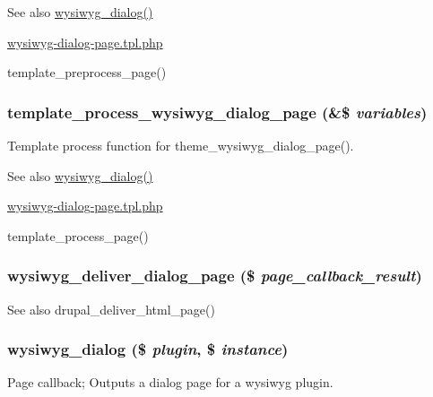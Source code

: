 \begin{DoxySeeAlso}{See also}
\hyperlink{wysiwyg_8dialog_8inc_a57c7ce003075f4a07b9a555a822755b8}{wysiwyg\_\-dialog()} 

\hyperlink{wysiwyg-dialog-page_8tpl_8php}{wysiwyg-\/dialog-\/page.tpl.php} 

template\_\-preprocess\_\-page() 
\end{DoxySeeAlso}
\hypertarget{wysiwyg_8dialog_8inc_ac59a9d7f504a104da018256132f53b60}{
\subsubsection[{template\_\-process\_\-wysiwyg\_\-dialog\_\-page}]{\setlength{\rightskip}{0pt plus 5cm}template\_\-process\_\-wysiwyg\_\-dialog\_\-page (\&\$ {\em variables})}}
\label{wysiwyg_8dialog_8inc_ac59a9d7f504a104da018256132f53b60}
Template process function for theme\_\-wysiwyg\_\-dialog\_\-page().

\begin{DoxySeeAlso}{See also}
\hyperlink{wysiwyg_8dialog_8inc_a57c7ce003075f4a07b9a555a822755b8}{wysiwyg\_\-dialog()} 

\hyperlink{wysiwyg-dialog-page_8tpl_8php}{wysiwyg-\/dialog-\/page.tpl.php} 

template\_\-process\_\-page() 
\end{DoxySeeAlso}
\hypertarget{wysiwyg_8dialog_8inc_a11742186be99db206b09a5682afa2130}{
\subsubsection[{wysiwyg\_\-deliver\_\-dialog\_\-page}]{\setlength{\rightskip}{0pt plus 5cm}wysiwyg\_\-deliver\_\-dialog\_\-page (\$ {\em page\_\-callback\_\-result})}}
\label{wysiwyg_8dialog_8inc_a11742186be99db206b09a5682afa2130}
\begin{DoxySeeAlso}{See also}
drupal\_\-deliver\_\-html\_\-page() 
\end{DoxySeeAlso}
\hypertarget{wysiwyg_8dialog_8inc_a57c7ce003075f4a07b9a555a822755b8}{
\subsubsection[{wysiwyg\_\-dialog}]{\setlength{\rightskip}{0pt plus 5cm}wysiwyg\_\-dialog (\$ {\em plugin}, \/  \$ {\em instance})}}
\label{wysiwyg_8dialog_8inc_a57c7ce003075f4a07b9a555a822755b8}
Page callback; Outputs a dialog page for a wysiwyg plugin.

